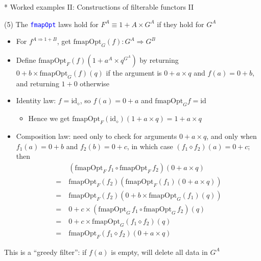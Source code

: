 \documentclass[english]{beamer}
\begin{document}
\begin{frame}{{*} Worked examples II: Constructions of filterable functors II}

(5) The \texttt{\textcolor{blue}{\footnotesize{}fmapOpt}} laws hold
for $F^{A}\equiv1+A\times G^{A}$ if they hold for $G^{A}$
\begin{itemize}
\item For $f^{A\Rightarrow1+B}$, get {\footnotesize{}$\text{fmapOpt}_{G}(f):G^{A}\Rightarrow G^{B}$}{\footnotesize \par}
\item {\footnotesize{}Define $\text{fmapOpt}_{F}(f)(1+a^{A}\times q^{G^{A}})$
by returning $0+b\times\text{fmapOpt}_{G}(f)(q)$ if the argument
is $0+a\times q$ and $f(a)=0+b$, and returning $1+0$ otherwise}{\footnotesize \par}
\item Identity law: {\footnotesize{}$f=\text{id}_{\diamond}$, so $f(a)=0+a$
and $\text{fmapOpt}_{G}f=\text{id}$}{\footnotesize \par}
\begin{itemize}
\item Hence we get{\footnotesize{} $\text{fmapOpt}_{F}(\text{id}_{\diamond})(1+a\times q)=1+a\times q$}{\footnotesize \par}
\end{itemize}
\item Composition law: {\footnotesize{}need only to check for arguments
$0+a\times q$, and only when $f_{1}(a)=0+b$ and $f_{2}(b)=0+c$,
in which case $(f_{1}\diamond f_{2})(a)=0+c$; then 
\begin{align*}
 & (\text{fmapOpt}_{F}\,f_{1}\circ\text{fmapOpt}_{F}\,f_{2})(0+a\times q)\\
=\  & \text{fmapOpt}_{F}(f_{2})\left(\text{fmapOpt}_{F}(f_{1})(0+a\times q)\right)\\
=\  & \text{fmapOpt}_{F}(f_{2})\left(0+b\times\text{fmapOpt}_{G}(f_{1})(q)\right)\\
=\  & 0+c\times(\text{fmapOpt}_{G}\,f_{1}\circ\text{fmapOpt}_{G}\,f_{2})(q)\\
=\  & 0+c\times\text{fmapOpt}_{G}(f_{1}\diamond f_{2})(q)\\
=\  & \text{fmapOpt}_{F}(f_{1}\diamond f_{2})(0+a\times q)
\end{align*}
}{\footnotesize \par}
\end{itemize}
This is a ``greedy filter'': if $f(a)$ is empty, will delete all
data in $G^{A}$
\end{frame}
\end{document}
